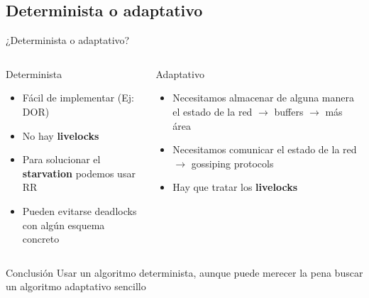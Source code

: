 \subsection{Determinista o adaptativo}
\begin{frame}{¿Determinista o adaptativo?}
    \begin{columns}
        \begin{column}{.5\textwidth}
            \begin{block}{Determinista}
                \begin{itemize}
                    \item Fácil de implementar (Ej: DOR) %
                    \item No hay \textbf{livelocks}
                    \item Para solucionar el \textbf{starvation} podemos usar RR
                    \item Pueden evitarse deadlocks con algún esquema concreto
                \end{itemize}
            \end{block}
        \end{column} %
        \begin{column}{.5\textwidth}
            \begin{block}{Adaptativo}
                \begin{itemize}
                    \item Necesitamos almacenar de alguna manera el estado de la red $\rightarrow$ buffers $\rightarrow$ más área
                    \item Necesitamos comunicar el estado de la red $\rightarrow$ gossiping protocols
                    \item Hay que tratar los \textbf{livelocks}
                \end{itemize}
            \end{block}
        \end{column}%
    \end{columns}
    
    \begin{exampleblock}{Conclusión}
        Usar un algoritmo determinista, aunque puede merecer la pena buscar un algoritmo adaptativo sencillo
    \end{exampleblock}
\end{frame}

